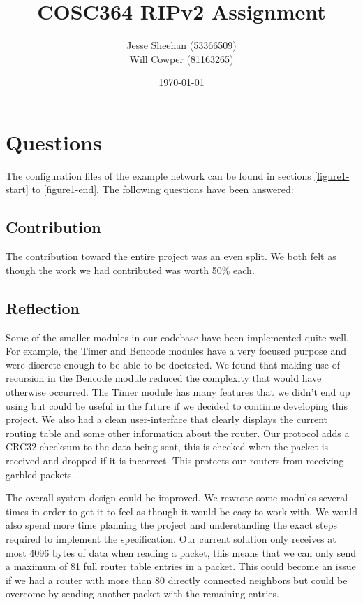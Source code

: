\documentclass[11pt]{article} %
\title{COSC364 RIPv2 Assignment}
\date{\today}
\author{Jesse Sheehan (53366509)\\ Will Cowper (81163265)}
\begin{document}
\maketitle

\tableofcontents

\newpage



\section{Questions} \label{questions}

The configuration files of the example network can be found in sections \ref{figure1-start} to \ref{figure1-end}. The following questions have been answered:

\subsection{Contribution}
The contribution toward the entire project was an even split. We both felt as though the work we had contributed was worth 50\% each.

\subsection{Reflection} \label{reflection}

Some of the smaller modules in our codebase have been implemented quite well. For example, the Timer and Bencode modules have a very focused purpose and were discrete enough to be able to be doctested.
We found that making use of recursion in the Bencode module reduced the complexity that would have otherwise occurred.
The Timer module has many features that we didn't end up using but could be useful in the future if we decided to continue developing this project.
We also had a clean user-interface that clearly displays the current routing table and some other information about the router.
Our protocol adds a CRC32 checksum to the data being sent, this is checked when the packet is received and dropped if it is incorrect. This protects our routers from receiving garbled packets.



The overall system design could be improved.
We rewrote some modules several times in order to get it to feel as though it would be easy to work with.
We would also spend more time planning the project and understanding the exact steps required to implement the specification.
Our current solution only receives at most 4096 bytes of data when reading a packet, this means that we can only send a maximum of 81 full router table entries in a packet. This could become an issue if we had a router with more than 80 directly connected neighbors but could be overcome by sending another packet with the remaining entries.
\end{document}
